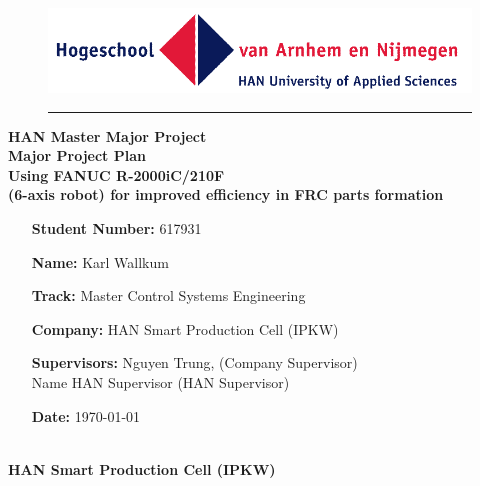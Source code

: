 \begin{titlepage}
	\begin{flushright}
	\begin{minipage}{\linewidth}
		\begin{figure}[H]
			\begin{flushright}
			\includegraphics[width=0.5\linewidth]{Images/HAN}
		\end{flushright}
		\hrule
		\end{figure}
		\begin{flushright}
			\large\textbf{ HAN Master Major Project}\\
			\vspace{20pt}
			\Huge\textbf{Major Project Plan
			\\
			\vspace{10pt}
			Using FANUC R-2000iC/210F\\
			(6-axis robot) for improved efficiency in FRC parts formation }
		\end{flushright}
		\vspace{35pt}
		\begin{figure}[H]
		\begin{flushleft}
		\end{flushleft}	
		\end{figure}
		\begin{itemize}[leftmargin=4.5cm]
			\LARGE	
			\item[\textbf{Student Number:}] 617931		
			\item[\textbf{Name:}] Karl Wallkum 			
			\item[\textbf{Track:}] Master Control Systems Engineering
			\item[\textbf{Company:}]  HAN Smart Production Cell (IPKW)
			\item[\textbf{Supervisors:}]  Nguyen Trung, (Company Supervisor)\\ Name HAN Supervisor (HAN Supervisor)			
			\item[\textbf{Date:}] \today		 		
		\end{itemize}
	\end{minipage}
	\end{flushright}

	\begin{flushleft}
	\large \textbf{
		\vspace{40pt}
		\\HAN Smart Production Cell (IPKW)
	}


\end{flushleft}
\end{titlepage}
